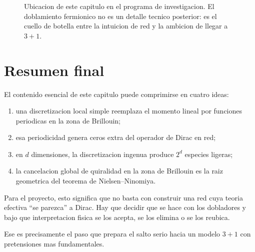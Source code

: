 \begin{figure}[ht]
\centering
{}
\caption{Ubicacion de este capitulo en el programa de investigacion. El doblamiento fermionico no es un detalle tecnico posterior: es el cuello de botella entre la intuicion de red y la ambicion de llegar a \(3+1\).}
\label{c26:fig:roadmap}
\end{figure}

\section{Resumen final}

El contenido esencial de este capitulo puede comprimirse en cuatro ideas:

\begin{enumerate}[leftmargin=*]
  \item una discretizacion local simple reemplaza el momento lineal por funciones periodicas en la zona de Brillouin;
  \item esa periodicidad genera ceros extra del operador de Dirac en red;
  \item en \(d\) dimensiones, la discretizacion ingenua produce \(2^d\) especies ligeras;
  \item la cancelacion global de quiralidad en la zona de Brillouin es la raiz geometrica del teorema de Nielsen--Ninomiya.
\end{enumerate}

Para el proyecto, esto significa que no basta con construir una red cuya teoria efectiva \enquote{se parezca} a Dirac. Hay que decidir que se hace con los dobladores y bajo que interpretacion fisica se los acepta, se los elimina o se los reubica.

Ese es precisamente el paso que prepara el salto serio hacia un modelo \(3+1\) con pretensiones mas fundamentales.
